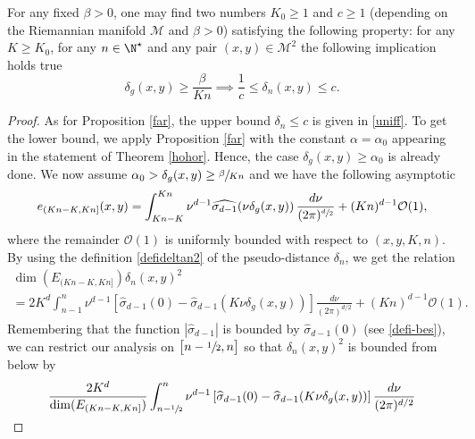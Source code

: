 \begin{prop}\label{minn}
For any fixed $\beta>0$, one may find two numbers $K_0\geq 1$ and $c\geq 1$ (depending on the Riemannian manifold $\mathcal{M}$ and $\beta>0$) satisfying the following property: for any $K\geq K_0$, for any $n\in \N^\star$ and any pair $(x,y)\in \mathcal{M}^2$ the following implication holds true
\begin{equation*}
\delta_g(x,y)\geq \frac{\beta}{Kn} \implies \frac{1}{c}\leq \delta_n(x,y)\leq c.
\end{equation*}
\end{prop}
\begin{proof}
As for Proposition \ref{far}, the upper bound $\delta_n\leq c$ is given in \eqref{uniff}.
To get the lower bound, we apply Proposition \ref{far} with the constant $\alpha=\alpha_0$ appearing in the statement of Theorem \ref{hohor}. Hence, the case $\delta_g(x,y)\geq \alpha_0$ is already done.
We now assume $\alpha_0>\delta_g(x,y)\geq \sfrac{\beta}{Kn}$ and we have the following asymptotic\vspace*{-3pt}
\begin{equation}\label{dd2}
e_{(Kn-K,Kn]}(x,y)=\int_{K n-K}^{K n}\nu^{d-1}\widehat{\sigma_{d-1}}(\nu \delta_g(x,y))\,\frac{d\nu}{(2\pi)^{\sfrac{d}{2}}}+(Kn)^{d-1}\mathcal{O}(1),
\end{equation}
where the remainder $\mathcal{O}(1)$ is uniformly bounded with respect to $(x,y,K,n)$.
By using the definition \eqref{defideltan2} of the pseudo-distance $\delta_n$, we get the relation\vspace*{-3pt}\enlargethispage{.5\baselineskip}%
\begin{multline*}
\dim(E_{(Kn-K,Kn]}) \delta_n(x,y)^2 \\[-3pt]
= 2K^{d}\int_{n-1}^{n} \nu^{d-1} \left[\widehat{\sigma}_{d-1}(0)-\widehat{\sigma}_{d-1}(K \nu \delta_g(x,y)) \right]\frac{d\nu}{(2\pi)^{d/2}}+(Kn)^{d-1}\mathcal{O}(1).
\end{multline*}
Remembering that the function $|\widehat{\sigma}_{d-1}|$ is bounded by $\widehat{\sigma}_{d-1}(0)$ (see \eqref{defi-bes}), we can restrict our analysis on $\big[n-\sfrac{1}{2},n\big]$ so that $\delta_n(x,y)^2$ is bounded from below by\vspace*{-7pt}
\begin{multline}\label{minonono}
\frac{2K^{d}}{\dim(E_{(Kn-K,Kn]}) }\int_{n-\sfrac{1}{2}}^{n} \nu^{d-1} \left[\widehat{\sigma}_{d-1}(0)-\widehat{\sigma}_{d-1}(K \nu \delta_g(x,y)) \right]\frac{d\nu}{(2\pi)^{d/2}}\\[-3pt]

\end{multline}
\end{proof}
